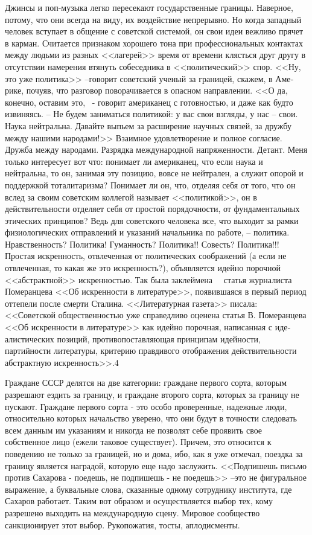 \documentclass{book}
\begin{document}
Джинсы и поп-музыка легко пересекают государственные границы. Наверное, потому, что они всегда на виду, их воздей­ствие непрерывно. Но когда западный человек вступает в об­щение с советской системой, он свои идеи вежливо прячет в карман. Считается признаком хорошего тона при професси­ональных контактах между людьми из разных <<лагерей>> время от времени клясться друг другу в отсутствии намерения втя­нуть собеседника в <<политический>> спор. <<Ну, это уже политика>> --говорит советский ученый за границей, скажем, в Аме­рике, почуяв, что разговор поворачивается в опасном направ­лении. <<О да, конечно, оставим это, ~- говорит американец с готовностью, и даже как будто извиняясь. -- Не будем зани­маться политикой: у вас свои взгляды, у нас -- свои. Наука нейтральна. Давайте выпьем за расширение научных связей, за дружбу между нашими народами!>> Взаимное удовлетворе­ние и полное согласие. Дружба между народами. Разрядка меж­дународной напряженности. Детант. Меня только интересует вот что: понимает ли американец, что 
если наука и нейтральна, то он, занимая эту позицию, вовсе не нейтрален, а служит опо­рой и поддержкой тоталитаризма? Понимает ли он, что, отделяя себя от того, что он вслед за своим советским коллегой назы­вает <<политикой>>, он в действительности отделяет себя от простой порядочности, от фундаментальных этических прин­ципов? Ведь для советского человека все, что выходит за рамки физиологических отправлений и указаний начальника по рабо­те, -- политика. Нравственность? Политика! Гуманность? По­литика!! Совесть? Политика!!! Простая искренность, отвлечен­ная от политических соображений (а если не отвлеченная, то какая же это искренность?), объявляется идейно порочной <<абстрактной>> искренностью. Так была заклеймена   статья журналиста Померанцева <<Об искренности в литературе>>, по­явившаяся в первый период оттепели после смерти Сталина. <<Литературная газета>> писала: <<Советской общественностью уже справедливо оценена статья В. Померанцева <<Об искрен­ности в литературе>> как идейно порочная, написанная с 
иде­алистических позиций, противопоставляющая принципам идей­ности, партийности литературы, критерию правдивого отобра­жения действительности абстрактную искренность>>.4

Граждане СССР делятся на две категории: граждане перво­го сорта, которым разрешают ездить за границу, и граждане второго сорта, которых за границу не пускают. Граждане пер­вого сорта - это особо проверенные, надежные люди, относи­тельно которых начальство уверено, что они будут в точности следовать всем данным им указаниям и никогда не позволят себе проявить свое собственное лицо (ежели таковое существует). Причем, это относится к поведению не только за границей, но и дома, ибо, как я уже отмечал, поездка за границу является наградой, которую еще надо заслужить. <<Подпишешь письмо против Сахарова - поедешь, не подпишешь - не пое­дешь>> --это не фигуральное выражение, а буквальные слова, сказанные одному сотруднику института, где Сахаров рабо­тает. Таким вот образом и осуществляется выбор тех, кому разрешено выходить на международную сцену. Мировое сооб­щество санкционирует этот выбор. Рукопожатия, тосты, апло­дисменты.
\end{document}

